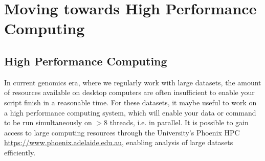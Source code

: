 \section{Moving towards High Performance Computing}
%
%
%
%

\subsection{High Performance Computing}
\begin{information}
In current genomics era, where we regularly work with large datasets, the amount of resources
available on desktop computers are often insufficient to enable your script finish in a reasonable
time. 
For these datasets, it maybe useful to work on a high performance computing system, which will
enable your data or command to be run simultaneously on $>8$ threads, i.e. in parallel.
It is possible to gain access to large computing resources through the University's Phoenix HPC
\url{https://www.phoenix.adelaide.edu.au}, enabling analysis of large datasets efficiently.\\ 

\end{information}


